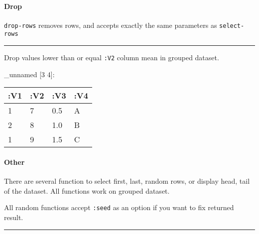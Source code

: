 \documentclass[]{article}
\newenvironment{Shaded}{\begin{snugshade}}{\end{snugshade}}
\newcommand{\AttributeTok}[1]{\textcolor[rgb]{0.77,0.63,0.00}{#1}}
\newcommand{\KeywordTok}[1]{\textcolor[rgb]{0.13,0.29,0.53}{\textbf{#1}}}
\newcommand{\NormalTok}[1]{#1}
\newcommand{\VariableTok}[1]{\textcolor[rgb]{0.00,0.00,0.00}{#1}}
\let\oldparagraph\paragraph
\renewcommand{\paragraph}[1]{\oldparagraph{#1}\mbox{}}
\begin{document}
\hypertarget{drop-1}{%
\paragraph{Drop}\label{drop-1}}

\texttt{drop-rows} removes rows, and accepts exactly the same parameters
as \texttt{select-rows}

\begin{center}\rule{0.5\linewidth}{0.5pt}\end{center}

Drop values lower than or equal \texttt{:V2} column mean in grouped
dataset.

\begin{Shaded}
\end{Shaded}

\_unnamed {[}3 4{]}:

\begin{longtable}[]{@{}llll@{}}
\toprule
:V1 & :V2 & :V3 & :V4\tabularnewline
\midrule
\endhead
1 & 7 & 0.5 & A\tabularnewline
2 & 8 & 1.0 & B\tabularnewline
1 & 9 & 1.5 & C\tabularnewline
\bottomrule
\end{longtable}

\hypertarget{other}{%
\paragraph{Other}\label{other}}

There are several function to select first, last, random rows, or
display head, tail of the dataset. All functions work on grouped
dataset.

All random functions accept \texttt{:seed} as an option if you want to
fix returned result.

\begin{center}\rule{0.5\linewidth}{0.5pt}\end{center}
\end{document}
